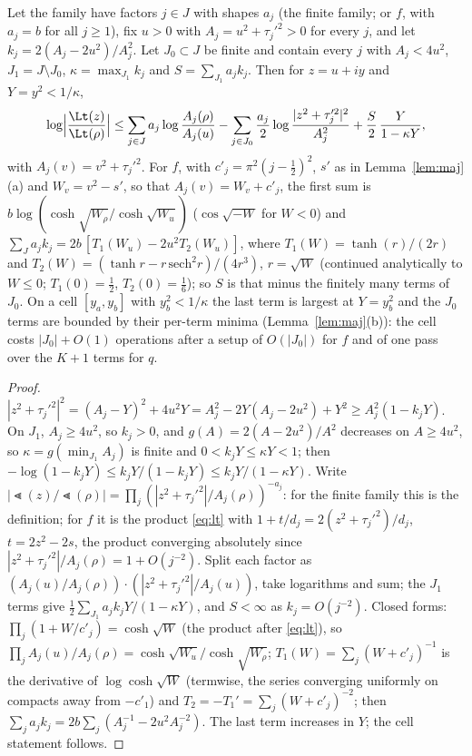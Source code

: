 \begin{lemma}\label{lem:agg}
Let the family have factors $j\in J$ with shapes $a_j$ (the finite family; or $f$, with $a_j=b$ for all $j\ge1$),
fix $u>0$ with $A_j=u^2+\tau_j'^2>0$ for every $j$, and let $k_j=2(A_j-2u^2)/A_j^2$. Let $J_0\subset J$ be finite and
contain every $j$ with $A_j<4u^2$, $J_1=J\setminus J_0$, $\kappa=\max_{J_1}k_j$ and $S=\sum_{J_1}a_jk_j$. Then for
$z=u+iy$ and $Y=y^2<1/\kappa$,
\[
\log\Bigl|\frac{\Lt(z)}{\Lt(\rho)}\Bigr|\le\sum_{j\in J}a_j\log\frac{A_j(\rho)}{A_j(u)}
-\sum_{j\in J_0}\frac{a_j}2\log\frac{|z^2+\tau_j'^2|^2}{A_j^2}+\frac S2\,\frac Y{1-\kappa Y},
\]
with $A_j(v)=v^2+\tau_j'^2$. For $f$, with $c'_j=\pi^2(j-\frac12)^2$, $s'$ as in Lemma~\ref{lem:maj}(a) and
$W_v=v^2-s'$, so that $A_j(v)=W_v+c'_j$, the first sum is $b\log(\cosh\sqrt{W_\rho}/\cosh\sqrt{W_u})$ ($\cos\sqrt{-W}$
for $W<0$) and $\sum_Ja_jk_j=2b\,[T_1(W_u)-2u^2T_2(W_u)]$, where $T_1(W)=\tanh(r)/(2r)$ and $T_2(W)=(\tanh r-r\,
\mathrm{sech}^2r)/(4r^3)$, $r=\sqrt W$ (continued analytically to $W\le0$; $T_1(0)=\frac12$, $T_2(0)=\frac16$); so
$S$ is that minus the finitely many terms of $J_0$. On a cell $[y_a,y_b]$ with $y_b^2<1/\kappa$ the last term is
largest at $Y=y_b^2$ and the $J_0$ terms are bounded by their per-term minima (Lemma~\ref{lem:maj}(b)): the cell
costs $|J_0|+O(1)$ operations after a setup of $O(|J_0|)$ for $f$ and of one pass over the $K+1$ terms for $q$.
\end{lemma}
\begin{proof}
$|z^2+\tau_j'^2|^2=(A_j-Y)^2+4u^2Y=A_j^2-2Y(A_j-2u^2)+Y^2\ge A_j^2(1-k_jY)$. On $J_1$, $A_j\ge4u^2$, so $k_j>0$, and
$g(A)=2(A-2u^2)/A^2$ decreases on $A\ge4u^2$, so $\kappa=g(\min_{J_1}A_j)$ is finite and $0<k_jY\le\kappa Y<1$;
then $-\log(1-k_jY)\le k_jY/(1-k_jY)\le k_jY/(1-\kappa Y)$. Write $|\Lt(z)/\Lt(\rho)|=\prod_j(|z^2+\tau_j'^2|/
A_j(\rho))^{-a_j}$: for the finite family this is the definition; for $f$ it is the product \eqref{eq:lt} with
$1+t/d_j=2(z^2+\tau_j'^2)/d_j$, $t=2z^2-2s$, the product converging absolutely since $|z^2+\tau_j'^2|/A_j(\rho)=
1+O(j^{-2})$. Split each factor as $(A_j(u)/A_j(\rho))\cdot(|z^2+\tau_j'^2|/A_j(u))$, take logarithms and sum;
the $J_1$ terms give $\frac12\sum_{J_1}a_jk_jY/(1-\kappa Y)$, and $S<\infty$ as $k_j=O(j^{-2})$. Closed forms:
$\prod_j(1+W/c'_j)=\cosh\sqrt W$ (the product after \eqref{eq:lt}), so $\prod_jA_j(u)/A_j(\rho)=\cosh\sqrt{W_u}/\cosh
\sqrt{W_\rho}$; $T_1(W)=\sum_j(W+c'_j)^{-1}$ is the derivative of $\log\cosh\sqrt W$ (termwise, the series converging
uniformly on compacts away from $-c'_1$) and $T_2=-T_1'=\sum_j(W+c'_j)^{-2}$; then
$\sum_ja_jk_j=2b\sum_j(A_j^{-1}-2u^2A_j^{-2})$. The last term increases in $Y$; the cell statement follows.
\end{proof}

